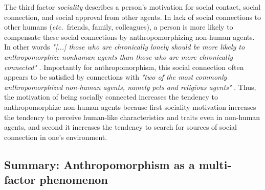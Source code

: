 \documentclass{frontiersSCNS} %
\newcommand{\etc}{{\textit{etc.~}}}
\begin{document}
The third factor \textit{sociality} describes a person's motivation for social contact, social connection, and social approval from other agents. In lack of social connections to other humans (\etc friends, family, colleagues), a person is more likely to compensate these social connections by anthropomorphizing non-human agents. In other words \textit{"[...] those who are chronically lonely should be more likely to anthropomorphize nonhuman agents than those who are more chronically connected"} \citep{epley_seeing_2007}. Importantly for anthropomorphism, this social connection often appears to be satisfied by connections with \textit{"two of the most commonly anthropomorphized non-human agents, namely pets and religious agents"} \citep{epley_seeing_2007}. Thus, the motivation of being socially connected increases the tendency to anthropomorphize non-human agents because first sociality motivation increases the tendency to perceive human-like characteristics and traits even in non-human agents, and second it increases the tendency to search for sources of social connection in one's environment.

  

%
%
%
%
%
%



\subsection{Summary: Anthropomorphism as a multi-factor phenomenon}
\label{sec:multi-factors}
\end{document}
